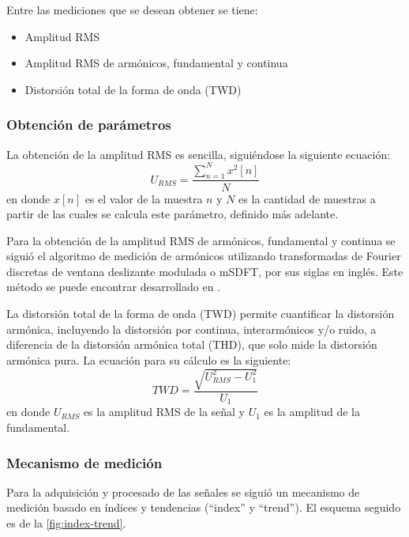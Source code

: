 \documentclass[../et.tex]{subfiles}
\begin{document}
Entre las mediciones que se desean obtener se tiene:

    \begin{itemize}
        \item Amplitud RMS
        \item Amplitud RMS de armónicos, fundamental y continua
        \item Distorsión total de la forma de onda (TWD)
    \end{itemize}

  \subsubsection{Obtención de parámetros}
  La obtención de la amplitud RMS es sencilla, siguiéndose la siguiente ecuación:
  \[
      U_{RMS} = \frac{\sum_{n = 1}^{N}x^2[n]}{N}
  \]
  en donde $x[n]$ es el valor de la muestra $n$ y $N$ es la cantidad de muestras a partir de las cuales se calcula este parámetro, definido más adelante.

  Para la obtención de la amplitud RMS de armónicos, fundamental y continua se siguió el algoritmo de medición de armónicos utilizando transformadas de Fourier discretas de ventana deslizante modulada o mSDFT, por sus siglas en inglés. Este método se puede encontrar desarrollado en \cite{msdft-paper}.

  La distorsión total de la forma de onda (TWD) permite cuantificar la distorsión armónica, incluyendo la distorsión por continua, interarmónicos y/o ruido, a diferencia de la distorsión armónica total (THD), que solo mide la distorsión armónica pura. La ecuación para su cálculo es la siguiente:
  \[
      TWD = \frac{\sqrt{U_{RMS}^2 - U_1^2}}{U_1}
  \]
  en donde $U_{RMS}$ es la amplitud RMS de la señal y $U_1$ es la amplitud de la fundamental.

  \subsubsection{Mecanismo de medición}
  Para la adquisición y procesado de las señales se siguió un mecanismo de medición basado en índices y tendencias (``index'' y ``trend''). El esquema seguido es de la \autoref{fig:index-trend}.
\end{document}
